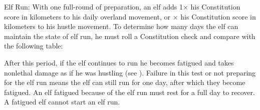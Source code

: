\begin{itemize*}
    \item Elf Run: With one full-round of preparation, an elf adds 1\onehalf $\times$ his Constitution score in kilometers to his daily overland movement, or \onehalf $\times$ his Constitution score in kilometers to his hustle movement. To determine how many days the elf can maintain the state of elf run, he must roll a Constitution check and compare with the following table:


    After this period, if the elf continues to run he becomes fatigued and takes nonlethal damage as if he was hustling (see ). Failure in this test or not preparing for the elf run means the elf can still run for one day, after which they become fatigued. An elf fatigued because of the elf run must rest for a full day to recover. A fatigued elf cannot start an elf run.


\end{itemize*}
